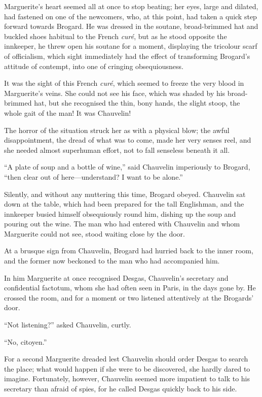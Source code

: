 Marguerite's heart seemed all at once to stop beating; her eyes, large and dilated, had fastened on one of the newcomers, who, at this point, had taken a quick step forward towards Brogard. He was dressed in the soutane, broad-brimmed hat and buckled shoes habitual to the French \textit{curé}, but as he stood opposite the innkeeper, he threw open his soutane for a moment, displaying the tricolour scarf of officialism, which sight immediately had the effect of transforming Brogard's attitude of contempt, into one of cringing obsequiousness.

It was the sight of this French \textit{curé}, which seemed to freeze the very blood in Marguerite's veins. She could not see his face, which was shaded by his broad-brimmed hat, but she recognised the thin, bony hands, the slight stoop, the whole gait of the man! It was Chauvelin!

The horror of the situation struck her as with a physical blow; the awful disappointment, the dread of what was to come, made her very senses reel, and she needed almost superhuman effort, not to fall senseless beneath it all.

\enquote{A plate of soup and a bottle of wine,} said Chauvelin imperiously to Brogard, \enquote{then clear out of here---understand? I want to be alone.}

Silently, and without any muttering this time, Brogard obeyed. Chauvelin sat down at the table, which had been prepared for the tall Englishman, and the innkeeper busied himself obsequiously round him, dishing up the soup and pouring out the wine. The man who had entered with Chauvelin and whom Marguerite could not see, stood waiting close by the door.

At a brusque sign from Chauvelin, Brogard had hurried back to the inner room, and the former now beckoned to the man who had accompanied him.

In him Marguerite at once recognised Desgas, Chauvelin's secretary and confidential factotum, whom she had often seen in Paris, in the days gone by. He crossed the room, and for a moment or two listened attentively at the Brogards’ door.

\enquote{Not listening?} asked Chauvelin, curtly.

\enquote{No, citoyen.}

For a second Marguerite dreaded lest Chauvelin should order Desgas to search the place; what would happen if she were to be discovered, she hardly dared to imagine. Fortunately, however, Chauvelin seemed more impatient to talk to his secretary than afraid of spies, for he called Desgas quickly back to his side.

